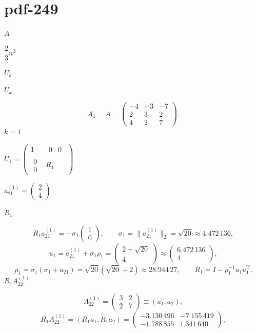 \documentclass[UTF8,fontset=fandol]{ctexart}
\begin{document}
\section*{pdf-249}
$A$\par
$\dfrac23n^3$\par
$U_k$\par
$U_k$\par
\[
A_1=A=\begin{pmatrix}-4&-3&-7\\2&3&2\\4&2&7\end{pmatrix}.
\]
$k=1$\par
$U_1=\begin{pmatrix}1&\begin{matrix}0&0\end{matrix}\\\begin{matrix}0\\0\end{matrix}&R_1\end{pmatrix}$\par
$a_{21}^{(1)}=\begin{pmatrix}2\\4\end{pmatrix}$\par
$R_1$\par
\[
R_1a_{21}^{(1)}=-\sigma_1\begin{pmatrix}1\\0\end{pmatrix},\qquad
\sigma_1=\|a_{21}^{(1)}\|_2=\sqrt{20}\approx4.472\,136,
\]
\[
u_1=a_{21}^{(1)}+\sigma_1\rho_1=\begin{pmatrix}2+\sqrt{20}\\4\end{pmatrix}
\approx\begin{pmatrix}6.472\,136\\4\end{pmatrix},
\]
\[
\rho_1=\sigma_1(\sigma_1+a_{21})=\sqrt{20}(\sqrt{20}+2)\approx28.944\,27,\qquad
R_1=I-\rho_1^{-1}u_1u_1^{\mathrm T}.
\]
$R_1A_{22}^{(1)}$\par
\[
A_{22}^{(1)}=\begin{pmatrix}3&2\\2&7\end{pmatrix}\equiv(a_1,a_2),
\]
\[
R_1A_{22}^{(1)}=(R_1a_1,R_1a_2)
=\begin{pmatrix}-3.130\,496&-7.155\,419\\-1.788\,855&1.341\,640\end{pmatrix},
\]
\end{document}
